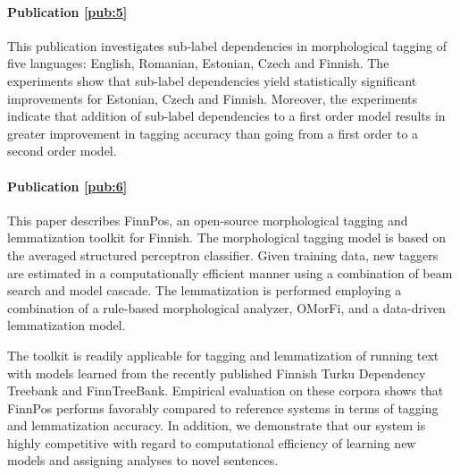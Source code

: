 \paragraph{Publication \ref{pub:5}} This publication investigates
sub-label dependencies in morphological tagging of five languages:
English, Romanian, Estonian, Czech and Finnish. The experiments show
that sub-label dependencies yield statistically significant
improvements for Estonian, Czech and Finnish. Moreover, the
experiments indicate that addition of sub-label dependencies to a
first order model results in greater improvement in tagging accuracy
than going from a first order to a second order model.

\paragraph{Publication \ref{pub:6}} This paper describes FinnPos, an
open-source morphological tagging and lemmatization toolkit for
Finnish.  The morphological tagging model is based on the averaged
structured perceptron classifier. Given training data, new taggers are
estimated in a computationally efficient manner using a combination of
beam search and model cascade. The lemmatization is performed
employing a combination of a rule-based morphological analyzer,
OMorFi, and a data-driven lemmatization model.

The toolkit is readily applicable for tagging and lemmatization of
running text with models learned from the recently published Finnish
Turku Dependency Treebank and FinnTreeBank.  Empirical evaluation on
these corpora shows that FinnPos performs favorably compared to
reference systems in terms of tagging and lemmatization accuracy. In
addition, we demonstrate that our system is highly competitive with
regard to computational efficiency of learning new models and
assigning analyses to novel sentences.
